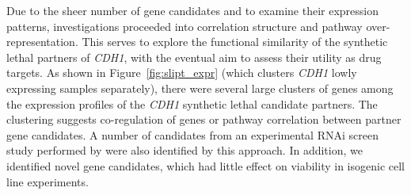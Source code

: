 Due to the sheer number of gene candidates and to examine their expression patterns, investigations proceeded into correlation structure and pathway over-represent\-ation. This serves to explore the functional similarity of the synthetic lethal partners of \textit{CDH1}, with the eventual aim to assess their utility as drug targets. As shown in Figure~\ref{fig:slipt_expr} (which clusters \textit{CDH1} lowly expressing samples separately), there were several large clusters of genes among the  expression profiles of the \textit{CDH1} synthetic lethal candidate partners. The clustering suggests co-regulation of genes or pathway correlation between partner gene candidates. A number of candidates from an experimental RNAi screen study performed by \citet{Telford2015} were also identified by this approach. In addition, we identified novel gene candidates, which had little effect on viability in isogenic cell line experiments. %

